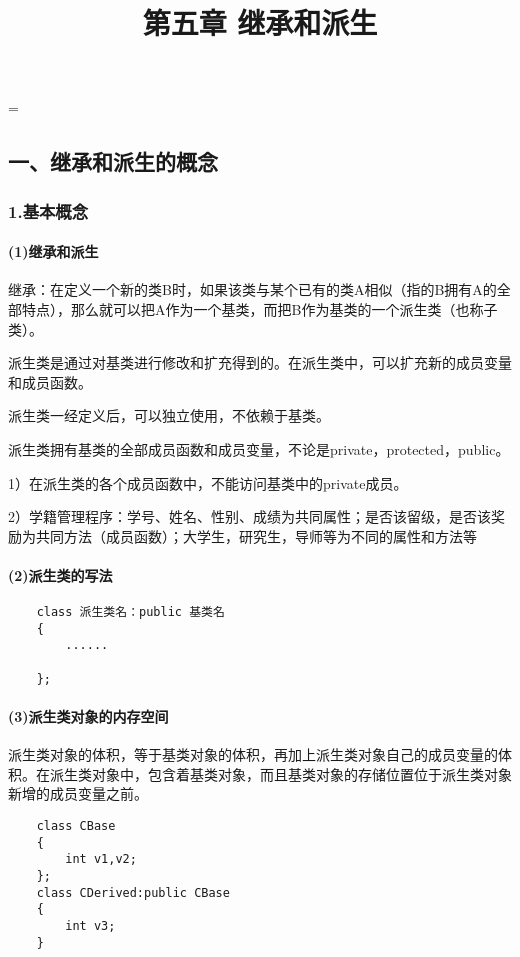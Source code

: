 \documentclass{article}
\begin{document}
 
\hfuzz=\maxdimen
{}
\begin{CJK}{UTF8}{gbsn}  
\title{第五章  继承和派生}
\author{}
\date{}
\maketitle
\part*{一、继承和派生的概念}
\section*{1.基本概念}
\subsection*{(1)继承和派生}
\subparagraph*{}
继承：在定义一个新的类B时，如果该类与某个已有的类A相似（指的B拥有A的全部特点），那么就可以把A作为一个基类，而把B作为基类的一个派生类（也称子类）。
\subparagraph*{}
派生类是通过对基类进行修改和扩充得到的。在派生类中，可以扩充新的成员变量和成员函数。
\subparagraph*{}
派生类一经定义后，可以独立使用，不依赖于基类。
\subparagraph*{}
派生类拥有基类的全部成员函数和成员变量，不论是private，protected，public。
\subparagraph*{}
1）在派生类的各个成员函数中，不能访问基类中的private成员。
\subparagraph*{}
2）学籍管理程序：学号、姓名、性别、成绩为共同属性；是否该留级，是否该奖励为共同方法（成员函数）；大学生，研究生，导师等为不同的属性和方法等
\subsection*{(2)派生类的写法}
\begin{verbatim}
    class 派生类名：public 基类名
    {
        ......
        
    };
\end{verbatim}
\subsection*{(3)派生类对象的内存空间}
\subparagraph*{}
派生类对象的体积，等于基类对象的体积，再加上派生类对象自己的成员变量的体积。在派生类对象中，包含着基类对象，而且基类对象的存储位置位于派生类对象新增的成员变量之前。
\begin{verbatim}
    class CBase
    {
        int v1,v2;  
    };
    class CDerived:public CBase
    {
        int v3;
    }
\end{verbatim}

\end{CJK}
\end{document}

